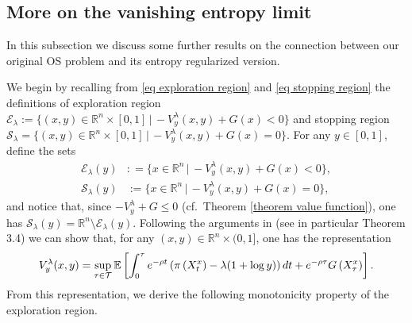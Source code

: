 \documentclass[11pt]{amsart}
\theoremstyle{plain}
\def \dd{{\rm d}}
\def \R{\mathbb{R}}
\numberwithin{equation}{section}
\begin{document}
\subsection{More on the vanishing entropy limit}
\label{subsection More on the vanishing entropy limit}
In this subsection we discuss some further results on the connection between our original OS problem and its entropy regularized version. 

We begin by recalling from \eqref{eq exploration region} and \eqref{eq stopping region} the definitions of exploration region $\mathcal E_\lambda := \{ (x,y) \in \R^n \times [0,1] \, | \, - V^\lambda_y (x,y) +  G(x) < 0 \}$  and stopping region $\mathcal S _\lambda = \{ (x,y) \in \R^n \times [0,1]\, | \, - V^\lambda_y (x,y) +  G(x) = 0 \}$.
For any $y \in [0,1]$, define the sets 
$$
\begin{aligned}    
\mathcal E_\lambda (y) &: = \{ x \in \R^n \, | \, - V^\lambda_y (x,y) +  G(x) < 0 \}, \\
\mathcal S _\lambda (y)& := \{ x \in \R^n \, | \, - V^\lambda_y (x,y) +  G(x) = 0 \},
\end{aligned}
$$
and notice that, since $-V_y^\lambda + G \leq 0$ (cf.\  Theorem \ref{theorem value function}), one has $\mathcal S _\lambda (y) = \R^n \setminus \mathcal E_\lambda (y)$. 
Following the arguments in \cite{Karatzas&Shreve84} (see in particular Theorem 3.4) we can show that, for any $(x, y) \in \mathbb{R}^{n} \times(0,1]$, one has the representation
\begin{equation}\label{eq conncection OS}
V^\lambda_y (x, y) =\sup _{\tau \in \mathcal T} \mathbb{E}\left[\int_{0}^{\tau} e ^{-\rho t} \left( \pi\left(X^x_{t}\right) - \lambda (1+\log y) \right) \dd t+e^{-\rho {\tau}} G\left(X^x_{\tau}\right)\right].
\end{equation}
From this representation, we derive the following monotonicity property of the exploration region. 
\end{document}

